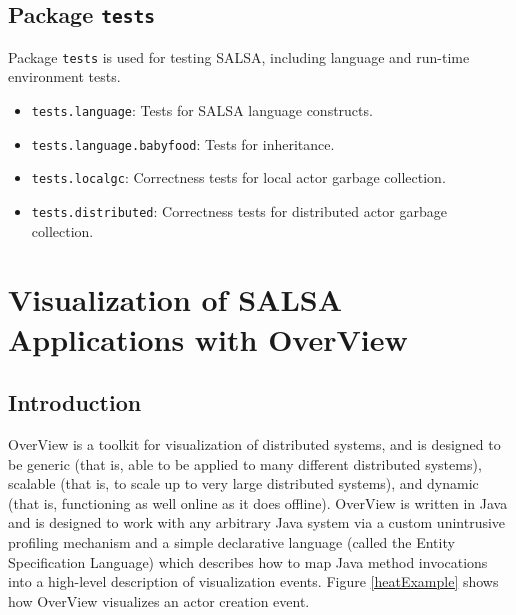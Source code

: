 {\section{Package {\tt tests}}
Package {\tt  tests} is used for testing SALSA, including language
and run-time environment tests.
\begin{itemize}
\item {\tt  tests.language}: Tests for SALSA language constructs.
\item {\tt  tests.language.babyfood}: Tests for inheritance.
\item {\tt  tests.localgc}: Correctness tests for local actor garbage collection.
\item {\tt  tests.distributed}: Correctness tests for distributed actor garbage collection.
\end{itemize}
}

\chapter{Visualization of SALSA Applications with OverView}\label{OverViewVisualization}
\section{Introduction}
OverView is a toolkit for visualization of distributed systems, and is designed to be generic (that is, able to be applied to many different distributed systems), scalable (that is, to scale up to very large distributed systems), and dynamic (that is, functioning as well online as it does offline). OverView is written in Java and is designed to work with any arbitrary Java system via a custom unintrusive profiling mechanism and a simple declarative language (called the Entity Specification Language) which describes how to map Java method invocations into a high-level description of visualization events. Figure \ref{heatExample} shows how OverView visualizes an actor creation event.

